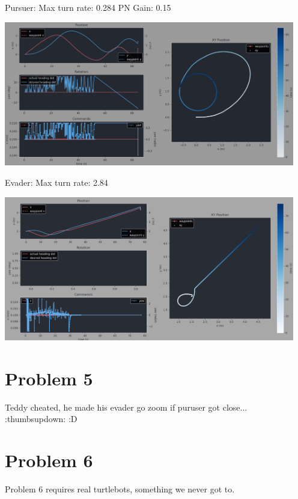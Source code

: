 \documentclass{article}
\begin{document}
    Pursuer: \break
    Max turn rate: 0.284 \break
    PN Gain: 0.15 \break
    \begin{center}
        \includegraphics[width=5in]{puruser_bad_puruser.png}
    \end{center}

    Evader: \break
    Max turn rate: 2.84 \break
    \begin{center}
        \includegraphics[width=5in]{evader_bad_pursuer.png}
    \end{center}
        
    \newpage
    \section*{Problem 5}
    Teddy cheated, he made his evader go zoom if puruser got close... :thumbsupdown: :D
    
    \section*{Problem 6}
    Problem 6 requires real turtlebots, something we never got to.
\end{document}
